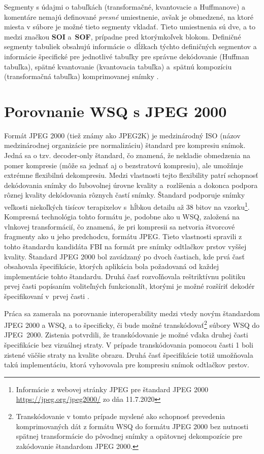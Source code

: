   Segmenty s údajmi o tabuľkách (transformačné, kvantovacie a Huffmanove) a komentáre nemajú definované \emph{presné} umiestnenie, avšak je obmedzené,
  na ktoré miesta v súbore je možné tieto segmenty vkladať. Tieto umiestnenia sú dve, a to medzi značkou \textbf{SOI} a~{\textbf{SOF}}, prípadne pred ktorýmkoľvek
  blokom. Definičné segmenty tabuliek obsahujú informácie o~dĺžkach týchto definičných segmentov a informácie špecifické pre jednotlivé tabuľky pre správne
  dekódovanie (Huffman tabuľka), spätné kvantovanie (kvantovacia tabuľka) a~spätnú kompozíciu (transformačná tabuľka) komprimovanej
  snímky \cite{WSQSpecification,brislawn1996compression}.

  \section{Porovnanie WSQ s JPEG 2000}
  Formát JPEG 2000 (tiež známy ako JPEG2K) je medzinárodný ISO (názov medzinárodnej organizácie pre normalizáciu) štandard pre kompresiu snímok.
  Jedná sa o tzv. decoder-only štandard, čo znamená, že nekladie obmedzenia
  na pomer kompresie (môže sa jednať aj o bezstratovú kompresiu), ale umožňuje extrémne flexibilnú dekompresiu. Medzi vlastnosti tejto flexibility patrí
  schopnosť dekódovania snímky do ľubovolnej úrovne kvality a~rozlíšenia a dokonca podpora rôznej kvality dekódovania rôznych častí snímky. Štandard podporuje
  snímky veľkosti niekoľkých tisícov terapixelov s~hĺbkou detailu až 38 bitov na vzorku\footnote{Informácie z webovej stránky JPEG pre štandard JPEG 2000
  \url{https://jpeg.org/jpeg2000/} zo dňa 11.7.2020}. Kompresná technológia tohto formátu je, podobne ako u WSQ, založená na
  vlnkovej transformácií, čo znamená, že pri kompresii sa netvoria štvorcové fragmenty ako u jeho predchodcu, formátu JPEG. Tieto vlastnosti spravili z tohto
  štandardu kandidáta FBI na formát pre snímky odtlačkov prstov vyššej kvality. Štandard JPEG 2000 bol zavádzaný po dvoch častiach, kde prvá časť obsahovala
  špecifikácie, ktorých aplikácia bola požadovaná od každej implementácie tohto štandardu. Druhá časť rozvoľňovala reštriktívnu politiku prvej časti popísaním
  voliteľných funkcionalít, ktorými je možné rozšíriť dekodér špecifikovaní v~prvej časti \cite{lepley2001jpeg,Libert}.

  Práca \cite{lepley2001jpeg} sa zamerala na porovnanie interoperability medzi vtedy novým štandardom JPEG 2000 a WSQ, a to špecificky, či bude možné
  transkódovať\footnote{Transkódovanie v tomto prípade myslené ako schopnosť prevedenia komprimovaných dát z formátu WSQ do formátu JPEG 2000 bez nutnosti
  spätnej transformácie do pôvodnej snímky a opätovnej dekompozície pre zakódovanie štandardom JPEG 2000.} súbory WSQ do JPEG~2000. Zistenia potvrdili,
  že transkódovanie je možné vďaka druhej časti špecifikácie bez vizuálnej straty. V prípade transkódovania pomocou časti 1 boli zistené väčšie straty
  na kvalite obrazu. Druhá časť špecifikácie totiž umožňovala takú implementáciu, ktorá vyhovovala pre kompresiu snímok odtlačkov prstov.


